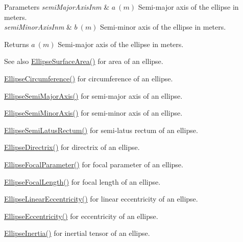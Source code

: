 \begin{DoxyParams}{Parameters}
{\em semi\+Major\+Axis\+Inm} & $ a\ (m)$ Semi-\/major axis of the ellipse in meters. \\
\hline
{\em semi\+Minor\+Axis\+Inm} & $ b\ (m)$ Semi-\/minor axis of the ellipse in meters. \\
\hline
\end{DoxyParams}
\begin{DoxyReturn}{Returns}
$ a\ (m)$ Semi-\/major axis of the ellipse in meters. 
\end{DoxyReturn}
\begin{DoxySeeAlso}{See also}
\mbox{\hyperlink{group___e_g_x_math-_geometry-2_d-_ellipse-_surface_area_ga4ce8c8323e9718ce5458f4ab7f6d823d}{Ellipse\+Surface\+Area()}} for area of an ellipse. 

\mbox{\hyperlink{group___e_g_x_math-_geometry-2_d-_ellipse-_circumference_ga4172802ac674eb53467b44928ac635c7}{Ellipse\+Circumference()}} for circumference of an ellipse. 

\mbox{\hyperlink{group___e_g_x_math-_geometry-2_d-_ellipse-_semi_major_axis_ga646a2ca065f4ac3f666a9ea22f3bb527}{Ellipse\+Semi\+Major\+Axis()}} for semi-\/major axis of an ellipse. 

\mbox{\hyperlink{group___e_g_x_math-_geometry-2_d-_ellipse-_semi_minor_axis_gae461acf3333565d69527dd86e9aa2b32}{Ellipse\+Semi\+Minor\+Axis()}} for semi-\/minor axis of an ellipse. 

\mbox{\hyperlink{group___e_g_x_math-_geometry-2_d-_ellipse-_semi_latus_rectum_gacfd1844eb4ef3d1ee3c0b460a6442ae6}{Ellipse\+Semi\+Latus\+Rectum()}} for semi-\/latus rectum of an ellipse. 

\mbox{\hyperlink{group___e_g_x_math-_geometry-2_d-_ellipse-_directrix_gace8f72a8efbc9c18d3eb689151405106}{Ellipse\+Directrix()}} for directrix of an ellipse. 

\mbox{\hyperlink{group___e_g_x_math-_geometry-2_d-_ellipse-_focal_parameter_ga4cd01a38c72c092ef9791351948bf69b}{Ellipse\+Focal\+Parameter()}} for focal parameter of an ellipse. 

\mbox{\hyperlink{group___e_g_x_math-_geometry-2_d-_ellipse-_focal_length_gab8d63de7640c880cfecaeada6f2afdac}{Ellipse\+Focal\+Length()}} for focal length of an ellipse. 

\mbox{\hyperlink{group___e_g_x_math-_geometry-2_d-_ellipse-_linear_eccentricity_gac70b3010e30aa8b73deb50fe2b9b9a91}{Ellipse\+Linear\+Eccentricity()}} for linear eccentricity of an ellipse. 

\mbox{\hyperlink{group___e_g_x_math-_geometry-2_d-_ellipse-_eccentricity_ga6a0a7fba17f782616894cfc447628c33}{Ellipse\+Eccentricity()}} for eccentricity of an ellipse. 

\mbox{\hyperlink{group___e_g_x_math-_geometry-2_d-_ellipse-_inertia_ga10a3049c2f04b50f271fb01dc62e4cf8}{Ellipse\+Inertia()}} for inertial tensor of an ellipse. 
\end{DoxySeeAlso}
